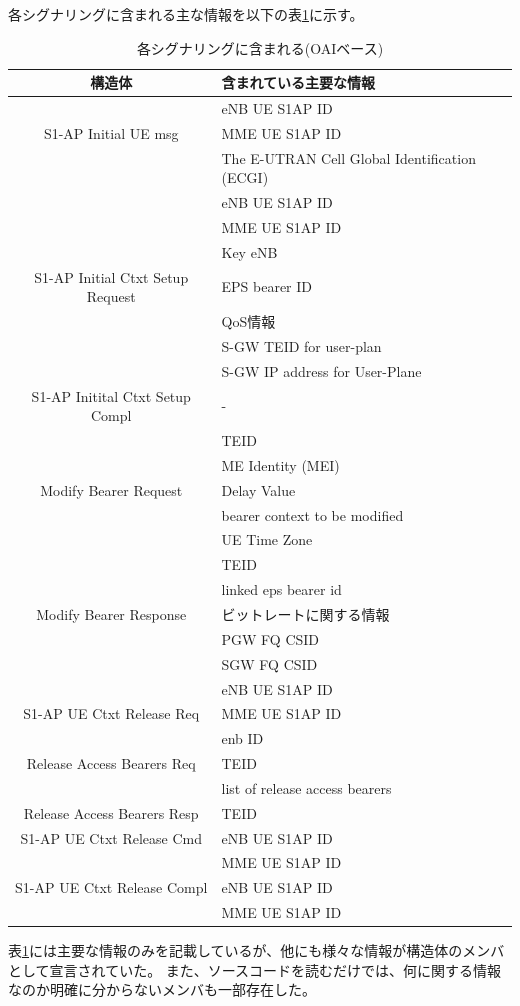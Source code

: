 \documentclass[a4j]{ujarticle}
\begin{document}
各シグナリングに含まれる主な情報を以下の表\ref{table:oai_signal_content}に示す。
\begin{table}[htbp]
  \centering
  \caption{各シグナリングに含まれる(OAIベース)}
  \label{table:oai_signal_content}
  \begin{tabular}{c|l}
    \hline
    構造体  & 含まれている主要な情報  \\ \hline \hline
    & eNB UE S1AP ID\\
    S1-AP Initial UE msg& MME UE S1AP ID\\
    & The E-UTRAN Cell Global Identification (ECGI)\\\hline
    & eNB UE S1AP ID\\
    & MME UE S1AP ID\\
    & Key eNB \\
    S1-AP Initial Ctxt Setup Request  & EPS bearer ID \\
    & QoS情報 \\
    & S-GW TEID for user-plan \\
    & S-GW IP address for User-Plane \\\hline
    S1-AP Initital Ctxt Setup Compl & -\\\hline
    & TEID\\
    & ME Identity (MEI)\\
    Modify Bearer Request & Delay Value\\
    & bearer context to be modified\\
    & UE Time Zone\\\hline
    & TEID\\
    & linked eps bearer id\\
    Modify Bearer Response  & ビットレートに関する情報\\
    & PGW FQ CSID\\
    & SGW FQ CSID\\\hline
    & eNB UE S1AP ID\\
    S1-AP UE Ctxt Release Req & MME UE S1AP ID\\
    & enb ID\\\hline
    Release Access Bearers Req  & TEID\\
    & list of release access bearers\\\hline
    Release Access Bearers Resp & TEID\\\hline
    S1-AP UE Ctxt Release Cmd & eNB UE S1AP ID\\
    & MME UE S1AP ID\\\hline
    S1-AP UE Ctxt Release Compl & eNB UE S1AP ID\\
    & MME UE S1AP ID\\\hline
  \end{tabular}
\end{table}
表\ref{table:oai_signal_content}には主要な情報のみを記載しているが、他にも様々な情報が構造体のメンバとして宣言されていた。
また、ソースコードを読むだけでは、何に関する情報なのか明確に分からないメンバも一部存在した。
\clearpage
\end{document}
